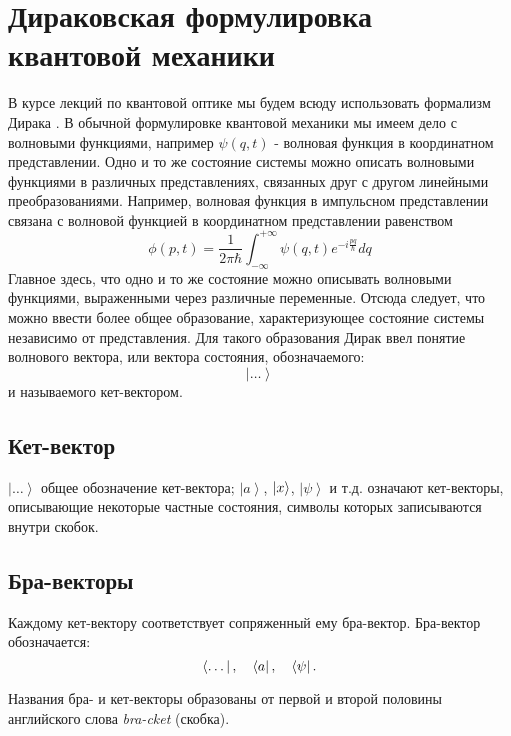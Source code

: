 \section{Дираковская  формулировка  квантовой  механики}
\label{AddDirac}
В курсе лекций по квантовой оптике мы будем всюду использовать формализм
Дирака \cite{bDiracPrincipleQuantumMechanic}. В обычной формулировке квантовой
механики мы имеем дело с волновыми функциями, например $\psi\left(q,
t\right)$ - волновая функция в 
координатном представлении. Одно и то же состояние системы можно
описать волновыми функциями в различных представлениях, связанных друг
с другом линейными преобразованиями. Например, волновая функция в
импульсном представлении связана с волновой функцией в координатном
представлении равенством 
\begin{equation}
\phi\left(p, t\right) = \frac{1}{2 \pi \hbar} \int_{-\infty}^{+\infty}
\psi \left(q, t\right) e^{-i \frac{p q}{\hbar}} dq
\end{equation}
Главное здесь, что одно и то же состояние можно описывать волновыми
функциями, выраженными через различные переменные. Отсюда следует, что
можно ввести более общее образование, характеризующее состояние
системы независимо от представления. Для такого образования Дирак ввел
понятие волнового вектора, или вектора состояния, обозначаемого: 
\begin{equation}
\left| \dots \right>
\end{equation}
и называемого кет-вектором.

\subsection{Кет-вектор}
$\left| \dots \right>$ общее обозначение кет-вектора;  $\left| a
\right>$,  $\ket{ x }$, $\left| \psi \right>$ и т.д. означают
кет-векторы, описывающие некоторые частные состояния, символы которых
записываются внутри скобок. 

\subsection{Бра-векторы}
Каждому кет-вектору соответствует сопряженный ему
бра-вектор. Бра-вектор обозначается: 
\begin{equation}
\left< \dots \right|, \quad 
\bra{ a }, \quad  
\left< \psi \right|.
\end{equation}

Названия бра- и кет-векторы образованы от первой и второй половины
английского слова  {\itshape bra-cket}  (скобка).

